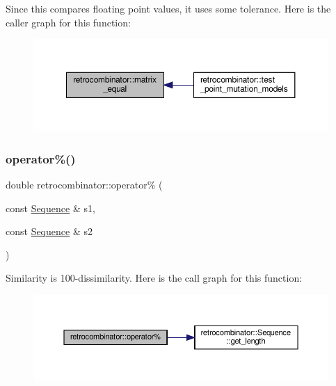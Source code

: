 Since this compares floating point values, it uses some tolerance. Here is the caller graph for this function\+:
\nopagebreak
\begin{figure}[H]
\begin{center}
\leavevmode
\includegraphics[width=350pt]{namespaceretrocombinator_a0e4387f4392819cd377c71d5771b39b1_icgraph}
\end{center}
\end{figure}
\mbox{\label{namespaceretrocombinator_a08dcf1f00c5ea301ff04e3389ed9b3e1}} 
\subsubsection{\texorpdfstring{operator\%()}{operator\%()}\hspace{0.1cm}{\footnotesize\ttfamily [1/2]}}
{\footnotesize\ttfamily double retrocombinator\+::operator\% (\begin{DoxyParamCaption}\item[{const \hyperlink{classretrocombinator_1_1Sequence}{Sequence} \&}]{s1,  }\item[{const \hyperlink{classretrocombinator_1_1Sequence}{Sequence} \&}]{s2 }\end{DoxyParamCaption})}

Similarity is 100-\/dissimilarity. Here is the call graph for this function\+:
\nopagebreak
\begin{figure}[H]
\begin{center}
\leavevmode
\includegraphics[width=350pt]{namespaceretrocombinator_a08dcf1f00c5ea301ff04e3389ed9b3e1_cgraph}
\end{center}
\end{figure}
\mbox{\label{namespaceretrocombinator_a540b38522d54f6df8c0b7d9541b287c7}} 
